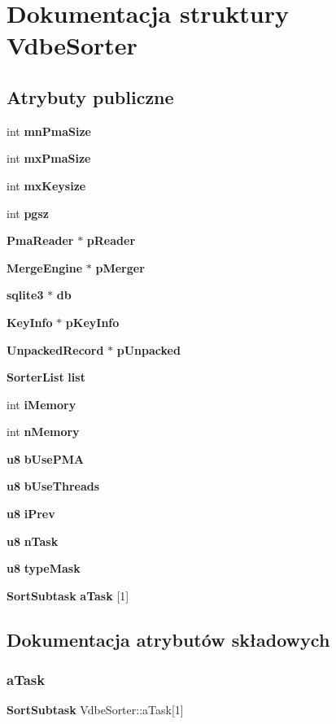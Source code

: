 \section{Dokumentacja struktury Vdbe\+Sorter}
\label{struct_vdbe_sorter}
\subsection*{Atrybuty publiczne}
\begin{DoxyCompactItemize}
\item 
int \textbf{ mn\+Pma\+Size}
\item 
int \textbf{ mx\+Pma\+Size}
\item 
int \textbf{ mx\+Keysize}
\item 
int \textbf{ pgsz}
\item 
\textbf{ Pma\+Reader} $\ast$ \textbf{ p\+Reader}
\item 
\textbf{ Merge\+Engine} $\ast$ \textbf{ p\+Merger}
\item 
\textbf{ sqlite3} $\ast$ \textbf{ db}
\item 
\textbf{ Key\+Info} $\ast$ \textbf{ p\+Key\+Info}
\item 
\textbf{ Unpacked\+Record} $\ast$ \textbf{ p\+Unpacked}
\item 
\textbf{ Sorter\+List} \textbf{ list}
\item 
int \textbf{ i\+Memory}
\item 
int \textbf{ n\+Memory}
\item 
\textbf{ u8} \textbf{ b\+Use\+P\+MA}
\item 
\textbf{ u8} \textbf{ b\+Use\+Threads}
\item 
\textbf{ u8} \textbf{ i\+Prev}
\item 
\textbf{ u8} \textbf{ n\+Task}
\item 
\textbf{ u8} \textbf{ type\+Mask}
\item 
\textbf{ Sort\+Subtask} \textbf{ a\+Task} [1]
\end{DoxyCompactItemize}


\subsection{Dokumentacja atrybutów składowych}
\mbox{\label{struct_vdbe_sorter_abf5c3d717a20bf0ce713862f0c7b2653}} 
\subsubsection{aTask}
{\footnotesize\ttfamily \textbf{ Sort\+Subtask} Vdbe\+Sorter\+::a\+Task[1]}

